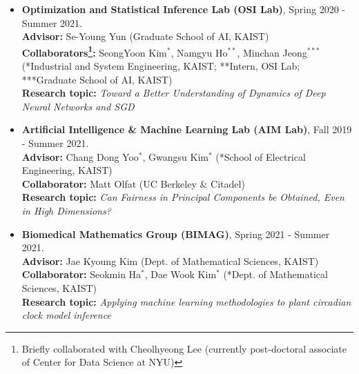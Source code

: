 \documentclass[10pt,a4]{article}
\begin{document}
\begin{small}
\begin{itemize}
 \item {\bf Optimization and Statistical Inference Lab (OSI Lab)}, Spring 2020 - Summer 2021. \\
 {\bf Advisor:} Se-Young Yun (Graduate School of AI, KAIST) \\
 {\bf Collaborators\footnote{Briefly collaborated with Cheolhyeong Lee (currently post-doctoral associate of Center for Data Science at NYU)}:} SeongYoon Kim$^{*}$, Namgyu Ho$^{**}$, Minchan Jeong$^{***}$ (*Industrial and System Engineering, KAIST; **Intern, OSI Lab; ***Graduate School of AI, KAIST) \\
 {\bf Research topic:} {\it Toward a Better Understanding of Dynamics of Deep Neural Networks and SGD } \\


 \item {\bf Artificial Intelligence \& Machine Learning Lab (AIM Lab)}, Fall 2019 - Summer 2021. \\
 {\bf Advisor:} Chang Dong Yoo$^{*}$, Gwangsu Kim$^{*}$ (*School of Electrical Engineering, KAIST) \\
 {\bf Collaborator:} Matt Olfat (UC Berkeley \& Citadel) \\
 {\bf Research topic:} {\it Can Fairness in Principal Components be Obtained, Even in High Dimensions?} \\

 \item {\bf Biomedical Mathematics Group (BIMAG)}, Spring 2021 - Summer 2021. \\
{\bf Advisor:} Jae Kyoung Kim (Dept. of Mathematical Sciences, KAIST) \\
{\bf Collaborator:} Seokmin Ha$^{*}$, Dae Wook Kim$^{*}$ (*Dept. of Mathematical Sciences, KAIST) \\
{\bf Research topic:} {\it Applying machine learning methodologies to plant circadian clock model inference} \\


\end{itemize}
\end{small}
\end{document}
